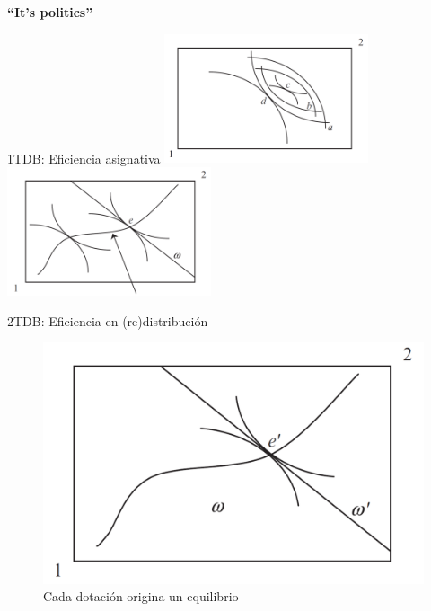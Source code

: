 \documentclass[
  ignorenonframetext,
]{beamer}
\begin{document}
\begin{frame}{\textbf{``It's politics''}}
\begin{block}{1TDB: Eficiencia asignativa}
\protect\hypertarget{tdb-eficiencia-asignativa}{}
\includegraphics[width=0.45\textwidth,height=\textheight]{fig/fig-01-006.png}
\includegraphics[width=0.45\textwidth,height=\textheight]{fig/fig-01-007.png}
\end{block}

\begin{block}{2TDB: Eficiencia en (re)distribución}
\protect\hypertarget{tdb-eficiencia-en-redistribuciuxf3n}{}
\begin{figure}

{\centering \includegraphics{fig/fig-01-008.png}

}

\caption{Cada dotación origina un equilibrio}

\end{figure}
\end{block}


\end{frame}
\end{document}
